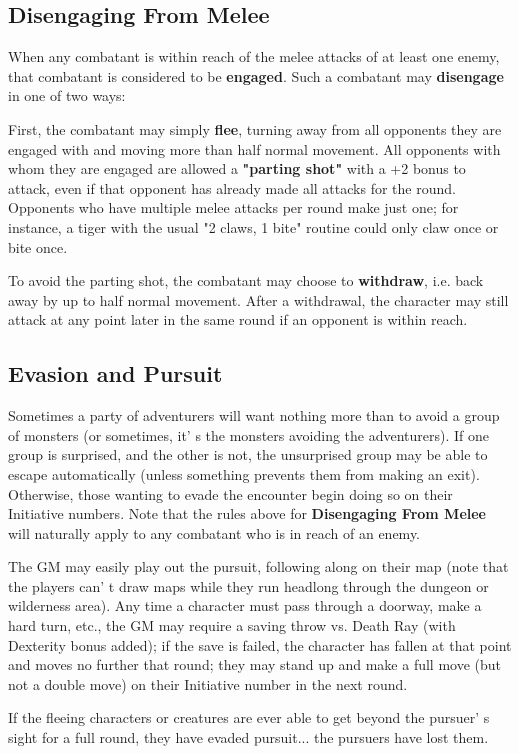 \documentclass[a4paper,twoside,openany,10pt]{book}
\begin{document}
\begin{multicols}{2}
\subsection{Disengaging From Melee}\label{disengaging-from-melee}

When any combatant is within reach of the melee attacks of at least one enemy, that combatant is considered to be \textbf{engaged}. Such a combatant may \textbf{disengage} in one of two ways:

First, the combatant may simply \textbf{flee}, turning away from all opponents they are engaged with and moving more than half normal movement. All opponents with whom they are engaged are allowed a \textbf{"parting shot"} with a +2 bonus to attack, even if that opponent has already made all attacks for the round. Opponents who have multiple melee attacks per round make just one; for instance, a tiger with the usual "2 claws, 1 bite" routine could only claw once or bite once.

To avoid the parting shot, the combatant may choose to \textbf{withdraw}, i.e. back away by up to half normal movement. After a withdrawal, the character may still attack at any point later in the same round if an opponent is within reach.

\subsection{Evasion and Pursuit}\label{evasion-and-pursuit}\hypertarget{evasion-and-pursuit}{}

Sometimes a party of adventurers will want nothing more than to avoid a group of monsters (or sometimes, it' s the monsters avoiding the adventurers). If one group is surprised, and the other is not, the unsurprised group may be able to escape automatically (unless something prevents them from making an exit). Otherwise, those wanting to evade the encounter begin doing so on their Initiative numbers. Note that the rules above for \textbf{Disengaging From Melee} will naturally apply to any combatant who is in reach of an enemy.

The GM may easily play out the pursuit, following along on their map (note that the players can' t draw maps while they run headlong through the dungeon or wilderness area). Any time a character must pass through a doorway, make a hard turn, etc., the GM may require a saving throw vs. Death Ray (with Dexterity bonus added); if the save is failed, the character has fallen at that point and moves no further that round; they may stand up and make a full move (but not a double move) on their Initiative number in the next round.

If the fleeing characters or creatures are ever able to get beyond the pursuer' s sight for a full round, they have evaded pursuit... the pursuers have lost them.

\end{multicols}
\end{document}
